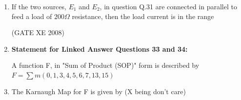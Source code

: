 \documentclass[12pt]{article}
\begin{document}
\begin{enumerate}
(GATE XE 2008)
\item  If the two sources, $E_{1}$ and $E_{2}$, in question Q.31 are connected in parallel to feed a load of $200\Omega$ resistance, then the load current is in the range

\begin{enumerate}
\end{enumerate}

(GATE XE 2008)
\item[] \textbf{Statement for Linked Answer Questions 33 and 34:}

A function F, in "Sum of Product (SOP)" form is described by$ F = \sum m (0,1,3,4,5,6,7,13,15)$

\item  The Karnaugh Map for F is given by (X being don't care)

\begin{enumerate}
\end{enumerate}
\end{enumerate}
\end{document}
